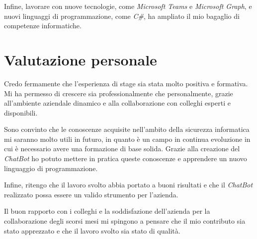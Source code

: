 Infine, lavorare con nuove tecnologie, come \emph{Microsoft Teams} e \emph{Microsoft Graph}, e nuovi linguaggi di programmazione, come \emph{C\#}, ha ampliato il mio bagaglio di competenze informatiche.

\section{Valutazione personale}

Credo fermamente che l'esperienza di stage sia stata molto positiva e formativa.
Mi ha permesso di crescere sia professionalmente che personalmente, grazie all'ambiente aziendale dinamico e alla collaborazione con colleghi esperti e disponibili.

Sono convinto che le conoscenze acquisite nell'ambito della sicurezza informatica mi saranno molto utili in futuro, in quanto è un campo in continua evoluzione in cui è necessario avere una formazione di base solida.
Grazie alla creazione del \emph{ChatBot} ho potuto mettere in pratica queste conoscenze e apprendere un nuovo linguaggio di programmazione.

Infine, ritengo che il lavoro svolto abbia portato a buoni risultati e che il \emph{ChatBot} realizzato possa essere un valido strumento per l'azienda.

Il buon rapporto con i colleghi e la soddisfazione dell'azienda per la collaborazione degli scorsi mesi mi spingono a pensare che il mio contributo sia stato apprezzato e che il lavoro svolto sia stato di qualità.